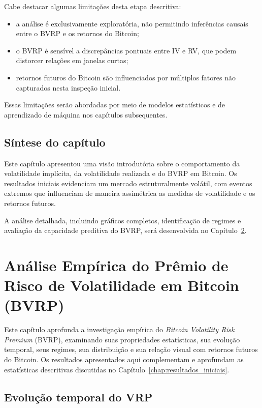 Cabe destacar algumas limitações desta etapa descritiva:

\begin{itemize}
    \item a análise é exclusivamente exploratória, não permitindo inferências
          causais entre o BVRP e os retornos do Bitcoin;
    \item o BVRP é sensível a discrepâncias pontuais entre IV e RV, que podem
          distorcer relações em janelas curtas;
    \item retornos futuros do Bitcoin são influenciados por múltiplos fatores
          não capturados nesta inspeção inicial.
\end{itemize}

Essas limitações serão abordadas por meio de modelos estatísticos e de
aprendizado de máquina nos capítulos subsequentes.

\section{Síntese do capítulo}

Este capítulo apresentou uma visão introdutória sobre o comportamento da
volatilidade implícita, da volatilidade realizada e do BVRP em Bitcoin. Os
resultados iniciais evidenciam um mercado estruturalmente volátil, com eventos
extremos que influenciam de maneira assimétrica as medidas de volatilidade e os
retornos futuros.

A análise detalhada, incluindo gráficos completos, identificação de regimes e
avaliação da capacidade preditiva do BVRP, será desenvolvida no
Capítulo~\ref{chap:analise_empirica}.

\chapter{Análise Empírica do Prêmio de Risco de Volatilidade em Bitcoin (BVRP)}
\label{chap:analise_empirica}

Este capítulo aprofunda a investigação empírica do \textit{Bitcoin Volatility
Risk Premium} (BVRP), examinando suas propriedades estatísticas, sua evolução
temporal, seus regimes, sua distribuição e sua relação visual com retornos
futuros do Bitcoin. Os resultados apresentados aqui complementam e aprofundam as
estatísticas descritivas discutidas no Capítulo~\ref{chap:resultados_iniciais}.

\section{Evolução temporal do VRP}

